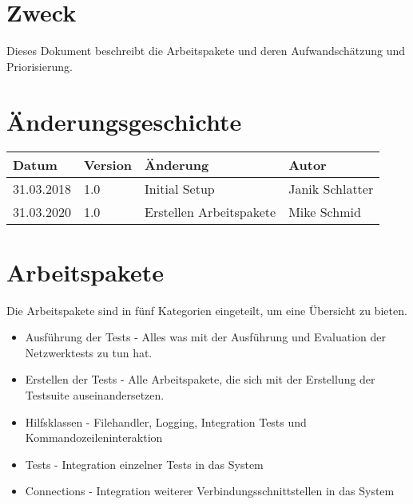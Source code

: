 \documentclass[
	ngerman,
	toc=listof, %
	toc=bibliography, %
	footnotes=multiple, %
	parskip=half, %
	numbers=noendperiod %
]{scrartcl}
\newcommand{\vorlagenOrdner}{../../99_Vorlagen} %
\begin{document}
\thispagestyle{plain}

\cleardoublepage


\section*{Zweck}
Dieses Dokument beschreibt die Arbeitspakete und deren Aufwandschätzung und Priorisierung.

\section*{Änderungsgeschichte}
\begin{tabularx}{\textwidth}{llXl}
	\toprule
	Datum & Version & Änderung & Autor \\
	\midrule
	31.03.2018 & 1.0 & Initial Setup & Janik Schlatter \\
	31.03.2020 & 1.0 & Erstellen Arbeitspakete & Mike Schmid \\
	\bottomrule
\end{tabularx}
\cleardoublepage

{}
\tableofcontents
\cleardoublepage

\let\stdsection\section
\renewcommand\section{\clearpage\stdsection}

\section{Arbeitspakete}
Die Arbeitspakete sind in fünf Kategorien eingeteilt, um eine Übersicht zu bieten. 
\begin{itemize}
	\item Ausführung der Tests - Alles was mit der Ausführung und Evaluation der Netzwerktests zu tun hat.
	\item Erstellen der Tests - Alle Arbeitspakete, die sich mit der Erstellung der Testsuite auseinandersetzen.
	\item Hilfsklassen - Filehandler, Logging, Integration Tests und Kommandozeileninteraktion
	\item Tests - Integration einzelner Tests in das System
	\item Connections - Integration weiterer Verbindungsschnittstellen in das System
\end{itemize}
\end{document}
